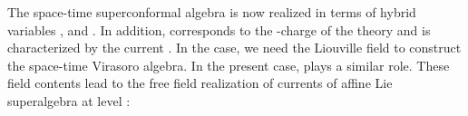 \documentclass[a4paper,12pt]{article}
\begin{document}
The space-time \coordHE{} superconformal algebra is now realized in terms of
hybrid variables \myHighlight{$(\beta,\gamma)$}\coordHE{}, \coordHE{} and \coordHE{}.
In addition, \coordHE{} corresponds to the \coordHE{}-charge of the 
theory and is characterized by the \coordHE{} current \coordHE{}.
In the \coordHE{} case\cite{GiKuSe}, we need the Liouville field to 
construct the space-time Virasoro algebra.
In the present case, \myHighlight{$\varphi$}\coordHE{} plays a similar role.
These field contents lead to the free field realization of currents of 
affine Lie superalgebra \coordHE{} at level \coordHE{}\cite{It0}:
\end{document}
